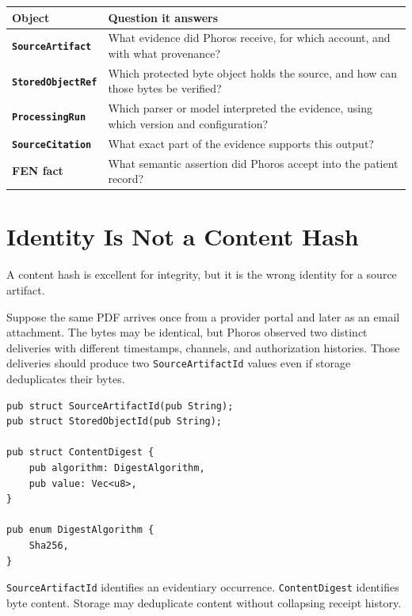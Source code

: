 \documentclass[11pt]{article}
\newcommand{\code}[1]{\texttt{#1}}
\begin{document}
\begin{center}
\begin{tabularx}{\textwidth}{>{\bfseries}p{} X}
\toprule
Object & Question it answers \\
\midrule
\code{SourceArtifact} & What evidence did Phoros receive, for which account, and with what provenance? \\
\code{StoredObjectRef} & Which protected byte object holds the source, and how can those bytes be verified? \\
\code{ProcessingRun} & Which parser or model interpreted the evidence, using which version and configuration? \\
\code{SourceCitation} & What exact part of the evidence supports this output? \\
FEN fact & What semantic assertion did Phoros accept into the patient record? \\
\bottomrule
\end{tabularx}
\end{center}

\section{Identity Is Not a Content Hash}

A content hash is excellent for integrity, but it is the wrong identity for a source artifact.

Suppose the same PDF arrives once from a provider portal and later as an email attachment. The bytes may be identical, but Phoros observed two distinct deliveries with different timestamps, channels, and authorization histories. Those deliveries should produce two \code{SourceArtifactId} values even if storage deduplicates their bytes.

\begin{lstlisting}
pub struct SourceArtifactId(pub String);
pub struct StoredObjectId(pub String);

pub struct ContentDigest {
    pub algorithm: DigestAlgorithm,
    pub value: Vec<u8>,
}

pub enum DigestAlgorithm {
    Sha256,
}
\end{lstlisting}

\begin{principlebox}
\code{SourceArtifactId} identifies an evidentiary occurrence. \code{ContentDigest} identifies byte content. Storage may deduplicate content without collapsing receipt history.
\end{principlebox}
\end{document}
